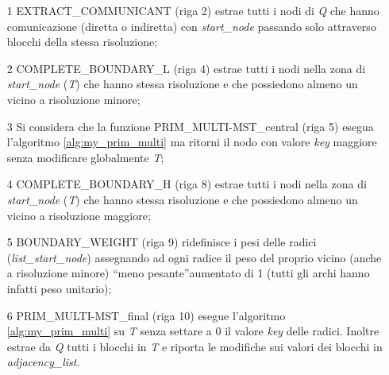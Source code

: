 {\begin{algorithm}[H]
\begin{algorithmic}[1]
	
		\EndIf
		\State \Return{}
		\EndFunction
	\end{algorithmic}
\end{algorithm}
\begin{itemize}
\color{mygreen}\item[1]\color{black} EXTRACT\_COMMUNICANT (riga 2) estrae tutti i nodi di \textit{Q} che hanno comunicazione (diretta o indiretta) con \textit{start\_node} passando solo attraverso blocchi della stessa risoluzione;
\color{mygreen}\item[2]\color{black} COMPLETE\_BOUNDARY\_L (riga 4) estrae tutti i nodi nella zona di \textit{start\_node} (\textit{T}) che hanno stessa risoluzione e che possiedono almeno un vicino a risoluzione minore;
\color{mygreen}\item[3]\color{black} Si considera che la funzione PRIM\_MULTI-MST\_central (riga 5) esegua l'algoritmo \ref{alg:my_prim_multi} ma ritorni il nodo con valore \textit{key} maggiore senza modificare globalmente \textit{T};
\color{mygreen}\item[4]\color{black} COMPLETE\_BOUNDARY\_H (riga 8) estrae tutti i nodi nella zona di \textit{start\_node} (\textit{T}) che hanno stessa risoluzione e che possiedono almeno un vicino a risoluzione maggiore;
\color{mygreen}\item[5]\color{black}BOUNDARY\_WEIGHT (riga 9) ridefinisce i pesi delle radici (\textit{list\_start\_node}) assegnando ad ogni radice il peso del proprio vicino (anche a risoluzione minore) \textquotedblleft meno pesante\textquotedblright aumentato di 1 (tutti gli archi hanno infatti peso unitario);
\color{mygreen}\item[6]\color{black} PRIM\_MULTI-MST\_final (riga 10) esegue l'algoritmo \ref{alg:my_prim_multi} su \textit{T} senza settare a 0 il valore \textit{key} delle radici. Inoltre estrae da \textit{Q} tutti i blocchi in \textit{T} e riporta le modifiche sui valori dei blocchi in \textit{adjacency\_list}.
\end{itemize}


}
